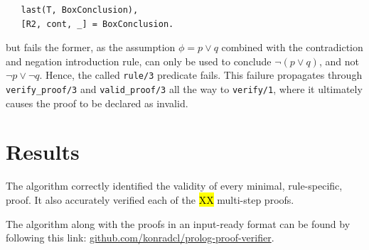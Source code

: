 \documentclass[a4paper, 11pt]{article}
\begin{document}
\begin{verbatim}
   last(T, BoxConclusion),
   [R2, cont, _] = BoxConclusion.
\end{verbatim}

   but fails the former, as the assumption $\phi = p \vee q$
   combined with the contradiction and negation introduction 
   rule, can only be used to conclude $\neg (p \vee q)$, and
   not $\neg p \vee \neg q$. Hence, the called
   \texttt{rule/3} predicate fails. This failure propagates
   through \texttt{verify\_proof/3} and 
   \texttt{valid\_proof/3} all the way to \texttt{verify/1},
   where it ultimately causes the proof to be declared as
   invalid.

   \section{Results}
   The algorithm correctly identified the validity of every
   minimal, rule-specific, proof. It also accurately verified
   each of the \hl{XX} multi-step proofs.
   \bigbreak

   The algorithm along with the proofs in an input-ready
   format can be found by following this link: 
   \url{github.com/konradcl/prolog-proof-verifier}.
\end{document}

